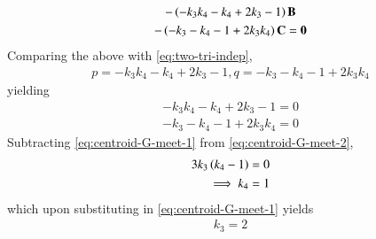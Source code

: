 \begin{enumerate}[label=\thesection.\arabic*.,ref=\thesection.\theenumi]
\begin{multline}
	  \\
	-  \left(-k_3k_4-k_4+2k_3-1\right)\mathbf{B}
	  \\
	  - \left(-k_3-k_4 - 1 
+2k_3k_4\right) \mathbf{C} = \mathbf{0}
  \end{multline}
  Comparing the above with 
	  \eqref{eq:two-tri-indep},
  \begin{align}
	  p = {-k_3k_4-k_4+2k_3-1}, q = {-k_3-k_4 - 1 
+2k_3k_4}
  \end{align}
  yielding 
  \begin{align}
	  \label{eq:centroid-G-meet-1}
	   {-k_3k_4-k_4+2k_3-1} = 0
	   \\ {-k_3-k_4 - 1 
+2k_3k_4} = 0
	  \label{eq:centroid-G-meet-2}
  \end{align}
  Subtracting 
	  \eqref{eq:centroid-G-meet-1}
	  from
	  \eqref{eq:centroid-G-meet-2},
  \begin{align}
	  3k_3\left(k_4-1\right) &= 0
	  \\
	  \implies k_4&=1
  \end{align}
  which upon substituting in 
	  \eqref{eq:centroid-G-meet-1}
	  yields
  \begin{align}
	  k_3 = 2
  \end{align}
\fi
\end{enumerate}
\iffalse
